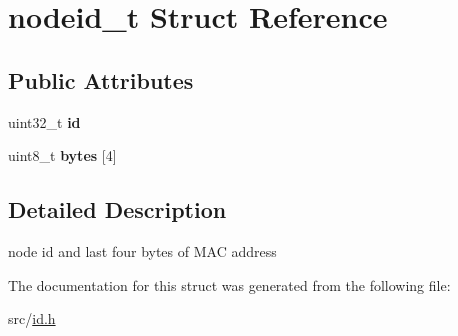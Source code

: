 \hypertarget{unionnodeid__t}{\section{nodeid\-\_\-t Struct Reference}
\label{unionnodeid__t}
}
\subsection*{Public Attributes}
\begin{DoxyCompactItemize}
\item 
\hypertarget{unionnodeid__t_a1e946677ad39dfeb9944ffce81432ba5}{uint32\-\_\-t {\bfseries id}}\label{unionnodeid__t_a1e946677ad39dfeb9944ffce81432ba5}

\item 
\hypertarget{unionnodeid__t_aaffc442232e5775496b5e322a9653a3b}{uint8\-\_\-t {\bfseries bytes} \mbox{[}4\mbox{]}}\label{unionnodeid__t_aaffc442232e5775496b5e322a9653a3b}

\end{DoxyCompactItemize}


\subsection{Detailed Description}
node id and last four bytes of M\-A\-C address 

The documentation for this struct was generated from the following file\-:\begin{DoxyCompactItemize}
\item 
src/\hyperlink{id_8h}{id.\-h}\end{DoxyCompactItemize}
